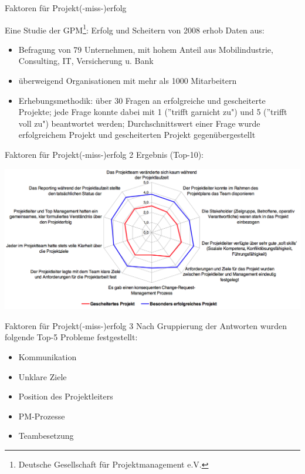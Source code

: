 \documentclass[12pt]{beamer}
\begin{document}
	\begin{frame}{Faktoren für Projekt(-miss-)erfolg}
		
		Eine Studie der GPM\footnote{Deutsche Gesellschaft für Projektmanagement e.V.}: Erfolg und Scheitern von 2008 erhob Daten aus: 
		\begin{itemize}
			\item{Befragung von 79 Unternehmen, mit hohem Anteil aus Mobilindustrie, Consulting, IT, Versicherung u. Bank }
			\item{überweigend Organisationen mit mehr als 1000 Mitarbeitern}
			\item{Erhebungsmethodik: über 30 Fragen an erfolgreiche und gescheiterte Projekte; jede Frage konnte dabei mit 1 (''trifft garnicht zu") und 5 (''trifft voll zu") beantwortet werden; Durchschnittswert einer Frage wurde erfolgreichem Projekt und gescheiterten Projekt gegenübergestellt}
		\end{itemize}

	\end{frame}

	\begin{frame}{Faktoren für Projekt(-miss-)erfolg 2}
	Ergebnis (Top-10):
		\begin{center}
			\includegraphics[width=1\textwidth]{images/studie_erfolgsfaktoren}
		\end{center}

	\end{frame}

	\begin{frame}{Faktoren für Projekt(-miss-)erfolg 3}
		Nach Gruppierung der Antworten wurden folgende Top-5 Probleme festgestellt:
		\begin{itemize}
			\item{Kommunikation}
			\item{Unklare Ziele}
			\item{Position des Projektleiters}
			\item{PM-Prozesse}
			\item{Teambesetzung}
		\end{itemize}

	\end{frame}
	
\end{document}
